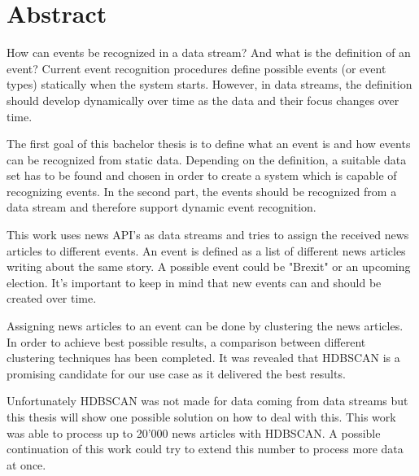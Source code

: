 
\section*{Abstract}

How can events be recognized in a data stream?
And what is the definition of an event?
Current event recognition procedures define possible events (or event types) statically when the system starts.
However, in data streams, the definition should develop dynamically over time as the data and their focus changes over time.

The first goal of this bachelor thesis is to define what an event is and how events can be recognized from static data.
Depending on the definition, a suitable data set has to be found and chosen in order to create a system
which is capable of recognizing events.
In the second part, the events should be recognized from a data stream and therefore support dynamic event recognition.

This work uses news API's as data streams and tries to assign the received news articles to different events.
An event is defined as a list of different news articles writing about the same story.
A possible event could be "Brexit" or an upcoming election.
It's important to keep in mind that new events can and should be created over time.

Assigning news articles to an event can be done by clustering the news articles.
In order to achieve best possible results, a comparison between different clustering techniques has been completed.
It was revealed that HDBSCAN is a promising candidate for our use case as it delivered the best results.

Unfortunately HDBSCAN was not made for data coming from data streams but this thesis will show
one possible solution on how to deal with this.
This work was able to process up to 20'000 news articles with HDBSCAN.
A possible continuation of this work could try to extend this number to process more data at once.


